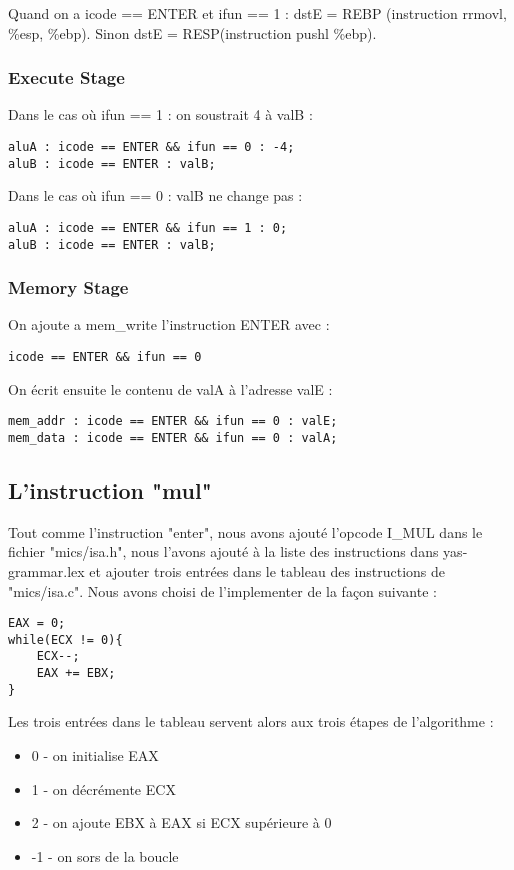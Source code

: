 \documentclass[12pt]{article}
\begin{document}
Quand on a icode == ENTER et ifun == 1 : dstE = REBP (instruction rrmovl, \%esp, \%ebp). Sinon dstE = RESP(instruction pushl \%ebp).

\subsubsection{Execute Stage}
Dans le cas où ifun == 1 : on soustrait 4 à valB :
\begin{verbatim}
aluA : icode == ENTER && ifun == 0 : -4;
aluB : icode == ENTER : valB;
\end{verbatim}

Dans le cas où ifun == 0 : valB ne change pas :
\begin{verbatim}
aluA : icode == ENTER && ifun == 1 : 0;
aluB : icode == ENTER : valB;
\end{verbatim}

\subsubsection{Memory Stage}
On ajoute a mem\_write l'instruction ENTER avec :
\begin{verbatim}
icode == ENTER && ifun == 0
\end{verbatim}

On écrit ensuite le contenu de valA à l'adresse valE :
\begin{verbatim}
mem_addr : icode == ENTER && ifun == 0 : valE;
mem_data : icode == ENTER && ifun == 0 : valA;
\end{verbatim}

\subsection{L'instruction "mul"}

Tout comme l'instruction "enter", nous avons ajouté l'opcode I\_MUL dans le fichier "mics/isa.h", nous l'avons ajouté à la liste des instructions dans yas-grammar.lex et ajouter trois entrées dans le tableau des instructions de "mics/isa.c". Nous avons choisi de l'implementer de la façon suivante : 
\begin{verbatim}
EAX = 0;
while(ECX != 0){
    ECX--;
    EAX += EBX;
}
\end{verbatim}

Les trois entrées dans le tableau servent alors aux trois étapes de l'algorithme :

\begin{itemize}
	\item 0 - on initialise EAX
	\item 1 - on décrémente ECX
	\item 2 - on ajoute EBX à EAX si ECX supérieure à 0
	\item -1 - on sors de la boucle
\end{itemize}
\end{document}
